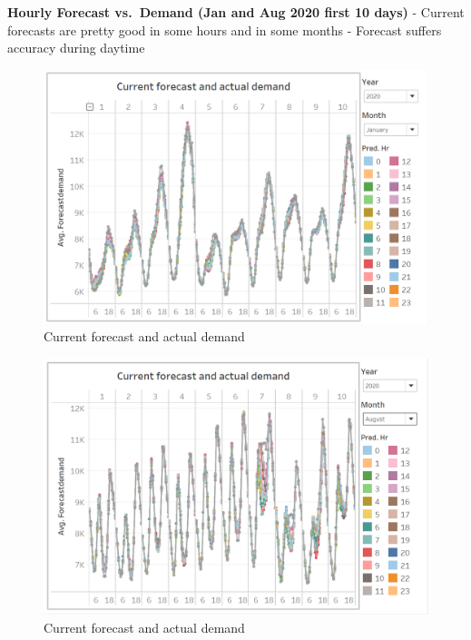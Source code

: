 \documentclass[mstat,12pt]{unswthesis}
\begin{document}
\textbf{Hourly Forecast vs.~Demand (Jan and Aug 2020 first 10 days)}
\newline \newline - Current forecasts are pretty good in some hours and
in some months \newline - Forecast suffers accuracy during daytime
\newline

\begin{figure}[H]
\includegraphics{snapshots1/Slide 5 snapshot 1.png}
\caption{Current forecast and actual demand}\label{4.6}
\end{figure}

\begin{figure}[H]
\includegraphics{snapshots1/Slide 5 snapshot 2.png}
\caption{Current forecast and actual demand}\label{4.7}
\end{figure}
\end{document}
